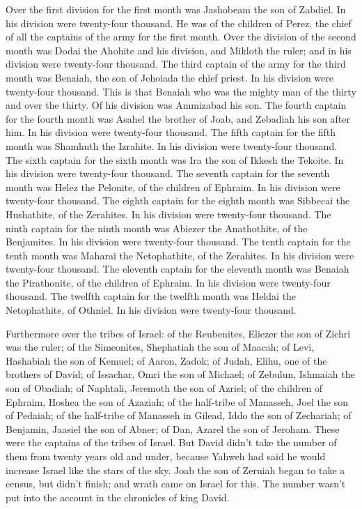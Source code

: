  Over the first division for the first month was Jashobeam
the son of Zabdiel. In his division were twenty-four thousand.
 He was of the children of Perez, the chief of all the
captains of the army for the first month.  Over the division
of the second month was Dodai the Ahohite and his division, and Mikloth
the ruler; and in his division were twenty-four thousand. 
The third captain of the army for the third month was Benaiah, the son
of Jehoiada the chief priest. In his division were twenty-four thousand.
 This is that Benaiah who was the mighty man of the thirty
and over the thirty. Of his division was Ammizabad his son. 
The fourth captain for the fourth month was Asahel the brother of Joab,
and Zebadiah his son after him. In his division were twenty-four
thousand.  The fifth captain for the fifth month was
Shamhuth the Izrahite. In his division were twenty-four thousand.
 The sixth captain for the sixth month was Ira the son of
Ikkesh the Tekoite. In his division were twenty-four thousand.
 The seventh captain for the seventh month was Helez the
Pelonite, of the children of Ephraim. In his division were twenty-four
thousand.  The eighth captain for the eighth month was
Sibbecai the Hushathite, of the Zerahites. In his division were
twenty-four thousand.  The ninth captain for the ninth
month was Abiezer the Anathothite, of the Benjamites. In his division
were twenty-four thousand.  The tenth captain for the tenth
month was Maharai the Netophathite, of the Zerahites. In his division
were twenty-four thousand.  The eleventh captain for the
eleventh month was Benaiah the Pirathonite, of the children of Ephraim.
In his division were twenty-four thousand.  The twelfth
captain for the twelfth month was Heldai the Netophathite, of Othniel.
In his division were twenty-four thousand.

 Furthermore over the tribes of Israel: of the Reubenites,
Eliezer the son of Zichri was the ruler; of the Simeonites, Shephatiah
the son of Maacah;  of Levi, Hashabiah the son of Kemuel;
of Aaron, Zadok;  of Judah, Elihu, one of the brothers of
David; of Issachar, Omri the son of Michael;  of Zebulun,
Ishmaiah the son of Obadiah; of Naphtali, Jeremoth the son of Azriel;
 of the children of Ephraim, Hoshea the son of Azaziah; of
the half-tribe of Manasseh, Joel the son of Pedaiah;  of
the half-tribe of Manasseh in Gilead, Iddo the son of Zechariah; of
Benjamin, Jaasiel the son of Abner;  of Dan, Azarel the son
of Jeroham. These were the captains of the tribes of Israel.
 But David didn't take the number of them from twenty years
old and under, because Yahweh had said he would increase Israel like the
stars of the sky.  Joab the son of Zeruiah began to take a
census, but didn't finish; and wrath came on Israel for this. The number
wasn't put into the account in the chronicles of king David.

